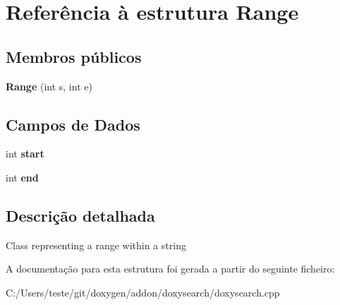 \hypertarget{struct_range}{\section{Referência à estrutura Range}
\label{struct_range}
}
\subsection*{Membros públicos}
\begin{DoxyCompactItemize}
\item 
\hypertarget{struct_range_a524c6140b9283c44973998abd6b822a4}{{\bfseries Range} (int s, int e)}\label{struct_range_a524c6140b9283c44973998abd6b822a4}

\end{DoxyCompactItemize}
\subsection*{Campos de Dados}
\begin{DoxyCompactItemize}
\item 
\hypertarget{struct_range_a37722a150250e2a5a98e5e0d11e53449}{int {\bfseries start}}\label{struct_range_a37722a150250e2a5a98e5e0d11e53449}

\item 
\hypertarget{struct_range_abce9f5dc9c83f2639b72024fdee5d388}{int {\bfseries end}}\label{struct_range_abce9f5dc9c83f2639b72024fdee5d388}

\end{DoxyCompactItemize}


\subsection{Descrição detalhada}
Class representing a range within a string 

A documentação para esta estrutura foi gerada a partir do seguinte ficheiro\-:\begin{DoxyCompactItemize}
\item 
C\-:/\-Users/teste/git/doxygen/addon/doxysearch/doxysearch.\-cpp\end{DoxyCompactItemize}
